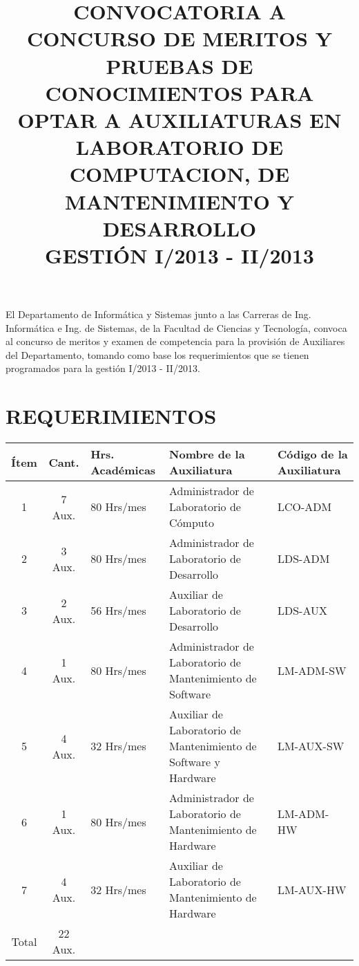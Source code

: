 \documentclass[letterpaper,11pt]{article}
\title{CONVOCATORIA A CONCURSO DE MERITOS Y PRUEBAS DE CONOCIMIENTOS PARA OPTAR A AUXILIATURAS EN LABORATORIO DE COMPUTACION, DE MANTENIMIENTO Y DESARROLLO\\GESTIÓN I/2013 - II/2013\\}
\date{}
\begin{document}
\maketitle
El Departamento de Informática y Sistemas junto a las Carreras de Ing. Informática e Ing. de Sistemas, de la Facultad de Ciencias y Tecnología, convoca al concurso de meritos y examen de competencia para la provisión de Auxiliares del Departamento, tomando como base los requerimientos que se tienen programados para la gestión I/2013 - II/2013.

\section{REQUERIMIENTOS}
\begin{tabular}{|c|c|p{2.8cm}|p{5.2cm}|p{2.8cm}|}
\hline
 \textbf{Ítem} & \textbf{Cant.} & \textbf{Hrs. Académicas} & \textbf{Nombre de la Auxiliatura} & \textbf{Código de la Auxiliatura} \\
\hline
 1 & 7 Aux. & 80 Hrs/mes & Administrador de Laboratorio de Cómputo & LCO-ADM \\
\hline
 2 & 3 Aux. & 80 Hrs/mes & Administrador de Laboratorio de Desarrollo & LDS-ADM \\
\hline
 3 & 2 Aux. & 56 Hrs/mes & Auxiliar de Laboratorio de Desarrollo & LDS-AUX \\
\hline
 4 & 1 Aux. & 80 Hrs/mes & Administrador de Laboratorio de Mantenimiento de Software & LM-ADM-SW \\
\hline
 5 & 4 Aux. & 32 Hrs/mes & Auxiliar de Laboratorio de Mantenimiento de Software y Hardware & LM-AUX-SW \\
\hline
 6 & 1 Aux. & 80 Hrs/mes & Administrador de Laboratorio de Mantenimiento de Hardware & LM-ADM-HW \\
\hline
 7 & 4 Aux. & 32 Hrs/mes & Auxiliar de Laboratorio de Mantenimiento de Hardware & LM-AUX-HW \\
\hline
 Total & 22 Aux. & \multicolumn{3}{|l|}{} \\
\hline
\end{tabular}
\end{document}
